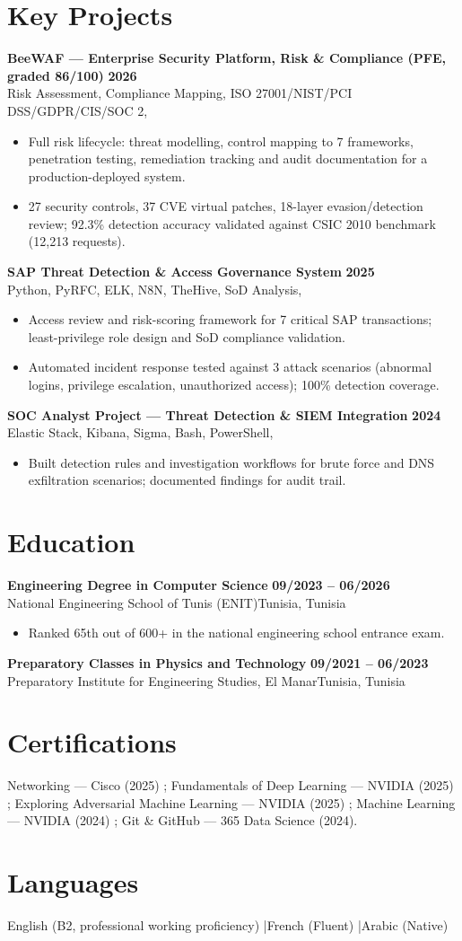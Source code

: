 \documentclass[a4paper,10pt]{article}
\newcommand{\cventry}[4]{\textbf{#1} \hfill \textbf{#4}\\[0.5pt]#2{\ifx\relax#3\relax\else, #3\fi}\par\vspace{0.8pt}}
\begin{document}
\section{Key Projects}
\cventry{BeeWAF --- Enterprise Security Platform, Risk \& Compliance (PFE, graded 86/100)}{Risk Assessment, Compliance Mapping, ISO 27001/NIST/PCI DSS/GDPR/CIS/SOC 2}{}{2026}
\begin{itemize}
  \item Full risk lifecycle: threat modelling, control mapping to 7 frameworks, penetration testing, remediation tracking and audit documentation for a production-deployed system.
  \item 27 security controls, 37 CVE virtual patches, 18-layer evasion/detection review; 92.3\% detection accuracy validated against CSIC 2010 benchmark (12,213 requests).
\end{itemize}
\cventry{SAP Threat Detection \& Access Governance System}{Python, PyRFC, ELK, N8N, TheHive, SoD Analysis}{}{2025}
\begin{itemize}
  \item Access review and risk-scoring framework for 7 critical SAP transactions; least-privilege role design and SoD compliance validation.
  \item Automated incident response tested against 3 attack scenarios (abnormal logins, privilege escalation, unauthorized access); 100\% detection coverage.
\end{itemize}
\cventry{SOC Analyst Project --- Threat Detection \& SIEM Integration}{Elastic Stack, Kibana, Sigma, Bash, PowerShell}{}{2024}
\begin{itemize}
  \item Built detection rules and investigation workflows for brute force and DNS exfiltration scenarios; documented findings for audit trail.
\end{itemize}
\section{Education}
\cventry{Engineering Degree in Computer Science}{National Engineering School of Tunis (ENIT)}{Tunisia}{09/2023 -- 06/2026}
\begin{itemize}
  \item Ranked 65th out of 600+ in the national engineering school entrance exam.
\end{itemize}
\cventry{Preparatory Classes in Physics and Technology}{Preparatory Institute for Engineering Studies, El Manar}{Tunisia}{09/2021 -- 06/2023}
\section{Certifications}
Networking --- Cisco (2025) ; Fundamentals of Deep Learning --- NVIDIA (2025) ; Exploring Adversarial Machine Learning --- NVIDIA (2025) ; Machine Learning --- NVIDIA (2024) ; Git \& GitHub --- 365 Data Science (2024).
\section{Languages}
English (B2, professional working proficiency) \quad|\quad French (Fluent) \quad|\quad Arabic (Native)
\end{document}
